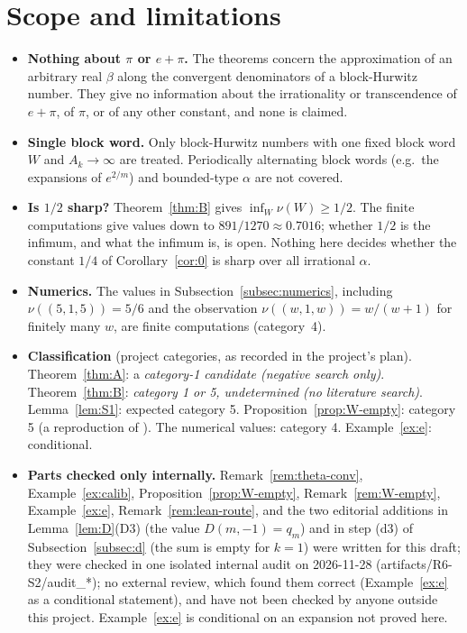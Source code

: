 \documentclass[11pt]{amsart}
\theoremstyle{definition}
\theoremstyle{remark}
\begin{document}
\section{Scope and limitations}\label{sec:scope}
\begin{itemize}
\item \textbf{Nothing about $\pi$ or $e+\pi$.} The theorems concern the approximation of an arbitrary real $\beta$
along the convergent denominators of a block-Hurwitz number. They give no information about the irrationality
or transcendence of $e+\pi$, of $\pi$, or of any other constant, and none is claimed.
\item \textbf{Single block word.} Only block-Hurwitz numbers with one fixed block word $W$ and $A_k\to\infty$ are
treated. Periodically alternating block words (e.g.\ the expansions of $e^{2/m}$) and bounded-type $\alpha$ are not
covered.
\item \textbf{Is $1/2$ sharp?} Theorem~\ref{thm:B} gives $\inf_W\nu(W)\ge1/2$. The finite computations give values
down to $891/1270\approx0.7016$; whether $1/2$ is the infimum, and what the infimum is, is open. Nothing here decides
whether the constant $1/4$ of Corollary~\ref{cor:0} is sharp over all irrational $\alpha$.
\item \textbf{Numerics.} The values in Subsection~\ref{subsec:numerics}, including $\nu((5,1,5))=5/6$ and the
observation $\nu((w,1,w))=w/(w+1)$ for finitely many $w$, are finite computations (category~4).
\item \textbf{Classification} (project categories, as recorded in the project's plan). Theorem~\ref{thm:A}: a
\emph{category-1 candidate (negative search only)}. Theorem~\ref{thm:B}: \emph{category 1 or 5, undetermined (no
literature search)}. Lemma~\ref{lem:S1}: expected category 5. Proposition~\ref{prop:W-empty}: category 5 (a
reproduction of \cite[Theorem~1]{D5}). The numerical values: category 4. Example~\ref{ex:e}: conditional.
\item \textbf{Parts checked only internally.} Remark~\ref{rem:theta-conv}, Example~\ref{ex:calib}, Proposition~\ref{prop:W-empty},
Remark~\ref{rem:W-empty}, Example~\ref{ex:e}, Remark~\ref{rem:lean-route}, and the two editorial additions in
Lemma~\ref{lem:D}(D3) (the value $D(m,-1)=q_m$) and in step (d3) of Subsection~\ref{subsec:d} (the sum is empty for
$k=1$) were written for this draft; they were checked in one isolated internal audit on 2026-11-28 (artifacts/R6-S2/audit\_*); no external review, which found them correct (Example~\ref{ex:e} as a conditional statement), and have not been checked by anyone outside this project. Example~\ref{ex:e} is conditional on an expansion not proved here.

\end{itemize}
\end{document}
